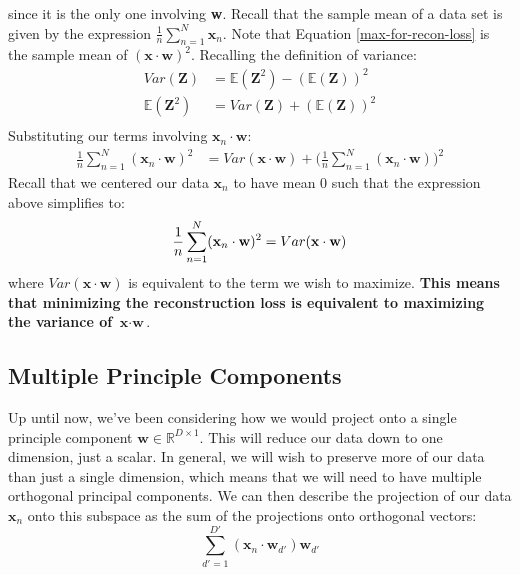 since it is the only one involving \textbf{w}. Recall that the sample mean of a data set is given by the expression $\frac{1}{n} \sum_{n=1}^{N} \textbf{x}_{n}$. Note that Equation \ref{max-for-recon-loss} is the sample mean of $(\textbf{x} \cdot \textbf{w})^{2}$. Recalling the definition of variance:
\begin{align*}
    Var(\textbf{Z}) &= \mathbb{E}(\textbf{Z}^{2}) - (\mathbb{E}(\textbf{Z}))^{2} \\
    \mathbb{E}(\textbf{Z}^{2}) &= Var(\textbf{Z}) + (\mathbb{E}(\textbf{Z}))^{2} \\
\end{align*}
Substituting our terms involving $\textbf{x}_{n} \cdot \textbf{w}$:
\begin{align*}
    \frac{1}{n} \sum_{n=1}^{N} (\textbf{x}_{n} \cdot \textbf{w})^{2} &= Var(\textbf{x} \cdot \textbf{w}) + \big( \frac{1}{n} \sum_{n=1}^{N} (\textbf{x}_{n} \cdot \textbf{w}) \big)^{2}
\end{align*}
Recall that we centered our data $\textbf{x}_{n}$ to have mean 0 such that the expression above simplifies to:
\begin{equation} \label{variance-equivalence}
    \frac{1}{n} \sum_{n=1}^{N} (\textbf{x}_{n} \cdot \textbf{w})^{2} = Var(\textbf{x} \cdot \textbf{w}) \\
\end{equation}
where $Var(\textbf{x} \cdot \textbf{w})$ is equivalent to the term we wish to maximize. \textbf{This means that minimizing the reconstruction loss is equivalent to maximizing the variance of $\textbf{x} \cdot \textbf{w}$}.


\subsection{Multiple Principle Components}
Up until now, we've been considering how we would project onto a single principle component $\textbf{w} \in \mathbb{R}^{D \times 1}$. This will reduce our data down to one dimension, just a scalar. In general, we will wish to preserve more of our data than just a single dimension, which means that we will need to have multiple orthogonal principal components. We can then describe the projection of our data $\textbf{x}_{n}$ onto this subspace as the sum of the projections onto orthogonal vectors:
\begin{equation} \label{orthogonal-projections}
    \sum_{d'=1}^{D'} (\textbf{x}_{n} \cdot \textbf{w}_{d'})\textbf{w}_{d'}
\end{equation}

